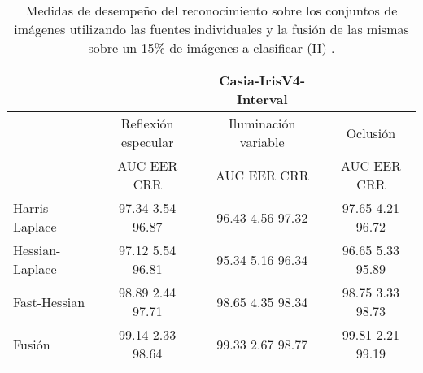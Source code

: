 \begin{table}[h]
\begin{center}
\begin{tabular}{@{}lccc@{}}
\toprule
&& Casia-IrisV4-Interval & \\ \hline
&Reflexión especular		&  	Iluminación variable		& Oclusión \\ \hline
&AUC  \phantom{aa} EER  \phantom{aa} CRR &  	AUC  \phantom{aa} EER  \phantom{aa} CRR		& AUC  \phantom{aa} EER  \phantom{aa} CRR \\ \hline
Harris-Laplace& 97.34 \phantom{aa} 3.54  \phantom{aa} 96.87 &  	96.43 \phantom{aa} 4.56  \phantom{aa}97.32		& 97.65 \phantom{aa} 4.21 \phantom{aa} 96.72 \\
Hessian-Laplace& 97.12 \phantom{aa} 5.54  \phantom{aa} 96.81 &  	95.34 \phantom{aa} 5.16 \phantom{aa} 96.34 & 96.65 \phantom{aa} 5.33 \phantom{aa} 95.89\\
Fast-Hessian& 98.89  \phantom{aa}2.44 \phantom{aa}  97.71 &  	98.65 \phantom{aa} 4.35 \phantom{aa}98.34		& 98.75  \phantom{aa}3.33 \phantom{aa} 98.73 \\
Fusión& 99.14 \phantom{aa} 2.33  \phantom{aa}98.64 &  	99.33  \phantom{aa}2.67 \phantom{aa} 98.77		& 99.81 \phantom{aa} 2.21  \phantom{aa}99.19 \\ \hline

\end{tabular}
\end{center}
\caption{Medidas de desempeño del reconocimiento sobre los conjuntos de imágenes utilizando las fuentes individuales y la fusión de las mismas sobre un 15\% de imágenes a clasificar (II) .}
\label{my_tabla}
\end{table}

\newpage

